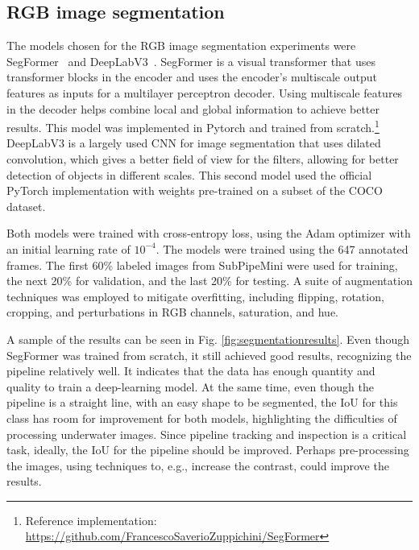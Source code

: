\subsection{RGB image segmentation}
 The models chosen for the RGB image segmentation experiments were SegFormer~\cite{xie2021segformer} and DeepLabV3~\cite{chen2017rethinking}. SegFormer is a visual transformer that uses transformer blocks in the encoder and uses the encoder's multiscale output features as inputs for a multilayer perceptron decoder. Using multiscale features in the decoder helps combine local and global information to achieve better results. This model was implemented in Pytorch and trained from scratch.\footnote{Reference implementation: \url{https://github.com/FrancescoSaverioZuppichini/SegFormer}} DeepLabV3 is a largely used \ac{CNN} for image segmentation that uses dilated convolution, which gives a better field of view for the filters, allowing for better detection of objects in different scales. This second model used the official PyTorch implementation with weights pre-trained on a subset of the COCO dataset. %

Both models were trained with cross-entropy loss, using the Adam optimizer with an initial learning rate of $10^{-4}$. The models were trained using the 647 annotated frames. The first 60\% labeled images from SubPipeMini were used for training, the next 20\% for validation, and the last 20\% for testing.  A suite of augmentation techniques was employed to mitigate overfitting, including flipping, rotation, cropping, and perturbations in RGB channels, saturation, and hue.

A sample of the results can be seen in Fig. \ref{fig:segmentationresults}. Even though SegFormer was trained from scratch, it still achieved good results, recognizing the pipeline relatively well. It indicates that the data has enough quantity and quality to train a deep-learning model. At the same time, even though the pipeline is a straight line, with an easy shape to be segmented, the \ac{IoU} for this class has room for improvement for both models, highlighting the difficulties of processing underwater images. Since pipeline tracking and inspection is a critical task, ideally, the \ac{IoU} for the pipeline should be improved. Perhaps pre-processing the images, using techniques to, e.g., increase the contrast, could improve the results. 

